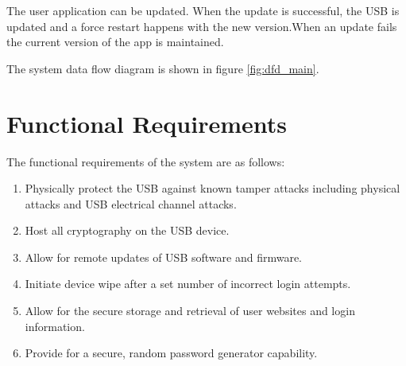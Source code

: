 The user application can be updated. When the update is successful, the USB is
updated and a force restart happens with the new version.When an update fails
the current version of the app is maintained.

The system data flow diagram is shown in figure \ref{fig:dfd_main}.


\section{Functional Requirements}
\label{sec:funcreq}
The functional requirements of the system are as follows:
\begin{enumerate}
    \item{Physically protect the USB against known tamper attacks including
physical attacks and USB electrical channel attacks.}
    \item{Host all cryptography on the USB device.}
    \item{Allow for remote updates of USB software and firmware.}
    \item{Initiate device wipe after a set number of incorrect login attempts.}
    \item{Allow for the secure storage and retrieval of user websites and login
information.}
    \item{Provide for a secure, random password generator capability.}
\end{enumerate}
